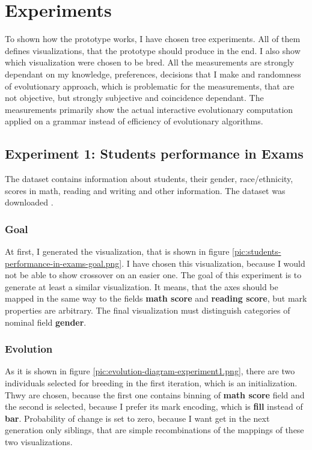 \chapter{Experiments}
To shown how the prototype works, I have chosen tree experiments. All of them defines visualizations, that the prototype should produce in the end. I also show which visualization were chosen to be bred. All the measurements are strongly dependant on my knowledge, preferences, decisions that I make and randomness of evolutionary approach, which is problematic for the measurements, that are not objective, but strongly subjective and coincidence dependant. The measurements primarily show the actual interactive evolutionary computation applied on a grammar instead of efficiency of evolutionary algorithms.
\section{Experiment 1: Students performance in Exams}
The dataset contains information about students, their gender, race/ethnicity, scores in math, reading and writing and other information. The dataset was downloaded \cite{students-performance-in-exams}.

\subsection{Goal}
At first, I generated the visualization, that is shown in figure \ref{pic:students-performance-in-exams-goal.png}. I have chosen this visualization, because I would not be able to show crossover on an easier one. The goal of this experiment is to generate at least a similar visualization. It means, that the axes should be mapped in the same way to the fields \textbf{math score} and \textbf{reading score}, but mark properties are arbitrary. The final visualization must distinguish categories of nominal field \textbf{gender}.


\subsection{Evolution}

As it is shown in figure \ref{pic:evolution-diagram-experiment1.png}, there are two individuals selected for breeding in the first iteration, which is an initialization. Thwy are chosen, because the first one contains binning of \textbf{math score} field and the second is selected, because I prefer its mark encoding, which is \textbf{fill} instead of \textbf{bar}.
Probability of change is set to zero, because I want get in the next generation only siblings, that are simple recombinations of the mappings of these two visualizations.

